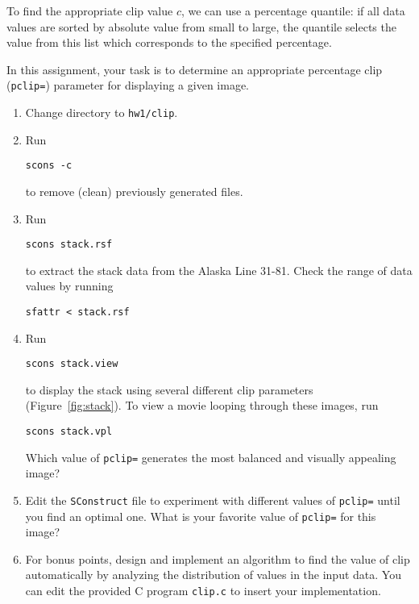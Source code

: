 To find the appropriate clip value $c$, we can use a percentage quantile:
if all data values are sorted by absolute value from small to large,
the quantile selects the value from this list which corresponds to the
specified percentage. 

In this assignment, your task is to determine an appropriate
percentage clip (\texttt{pclip=}) parameter for displaying a given image.       

\begin{enumerate}          
\item Change directory to \texttt{hw1/clip}.
\item Run
\begin{verbatim}
scons -c
\end{verbatim}
to remove (clean) previously generated files.
\item Run
\begin{verbatim}
scons stack.rsf
\end{verbatim}
to extract the stack data from the Alaska Line 31-81. Check the range of data values by running 
\begin{verbatim}
sfattr < stack.rsf
\end{verbatim}
\item Run
\begin{verbatim}
scons stack.view
\end{verbatim}
to display the stack using several different clip parameters
(Figure~\ref{fig:stack}). To view a movie looping through these
images, run
\begin{verbatim}
scons stack.vpl
\end{verbatim}
Which value of \texttt{pclip=} generates the most balanced and visually appealing image?


\item Edit the \texttt{SConstruct} file to experiment with different values of \texttt{pclip=} until you find an optimal one. What is your favorite value of \texttt{pclip=} for this image?

\answer{

}

\item For bonus points, design and implement an algorithm to find the value of clip automatically by analyzing the distribution of values in the input data. You can edit the provided C program \texttt{clip.c} to insert your implementation.


\end{enumerate}
